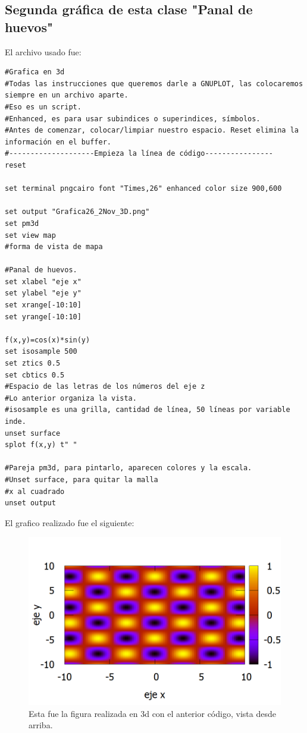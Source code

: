 \documentclass[onecolumn]{article} %
\begin{document}
\subsection{Segunda gráfica de esta clase "Panal de huevos"}
El archivo usado fue:
\begin{verbatim}
#Grafica en 3d
#Todas las instrucciones que queremos darle a GNUPLOT, las colocaremos siempre en un archivo aparte.
#Eso es un script.
#Enhanced, es para usar subindices o superindices, símbolos.
#Antes de comenzar, colocar/limpiar nuestro espacio. Reset elimina la información en el buffer.
#--------------------Empieza la línea de código----------------
reset

set terminal pngcairo font "Times,26" enhanced color size 900,600

set output "Grafica26_2Nov_3D.png"
set pm3d
set view map
#forma de vista de mapa

#Panal de huevos.
set xlabel "eje x"
set ylabel "eje y"
set xrange[-10:10]
set yrange[-10:10]

f(x,y)=cos(x)*sin(y)
set isosample 500
set ztics 0.5
set cbtics 0.5
#Espacio de las letras de los números del eje z
#Lo anterior organiza la vista.
#isosample es una grilla, cantidad de línea, 50 líneas por variable inde.
unset surface
splot f(x,y) t" "

#Pareja pm3d, para pintarlo, aparecen colores y la escala.
#Unset surface, para quitar la malla
#x al cuadrado
unset output

\end{verbatim}
El grafico realizado fue el siguiente:
\begin{figure}[h!]
	\centering
	\includegraphics[scale=0.2]{Grafica263D.png}
	\caption{\label{fig_3d}Esta fue la figura realizada en 3d con el anterior código, vista desde arriba.}
\end{figure}
\end{document}
